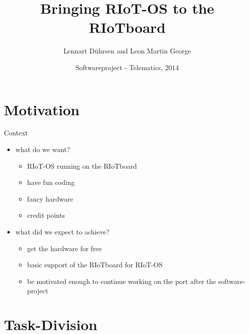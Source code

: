 \documentclass[9pt]{beamer}
\title{Bringing RIoT-OS to the RIoTboard}
\author{Lennart Dührsen and Leon Martin George}
\institute[FU Berlin]{Freie Universität Berlin}
\date{Softwareproject - Telematics, 2014}
\begin{document}
 \begin{frame}[plain]
  \titlepage
 \end{frame}

\section{Motivation}

\begin{frame}{Context}
 \begin{itemize}
\pause
 \item what do we want?
\pause
 \begin{itemize}
 \item RIoT-OS running on the RIoTboard
\pause
 \item have fun coding
\pause
 \item fancy hardware
\pause
 \item credit points
 \end{itemize}
\pause
 \item what did we expect to achieve?
\pause
 \begin{itemize}
 \item get the hardware for free
\pause
 \item basic support of the RIoTboard for RIoT-OS
\pause
 \item be motivated enough to continue working on the port after the software-project
 \end{itemize}
 \end{itemize}
\end{frame}

\section{Task-Division}
\end{document}
